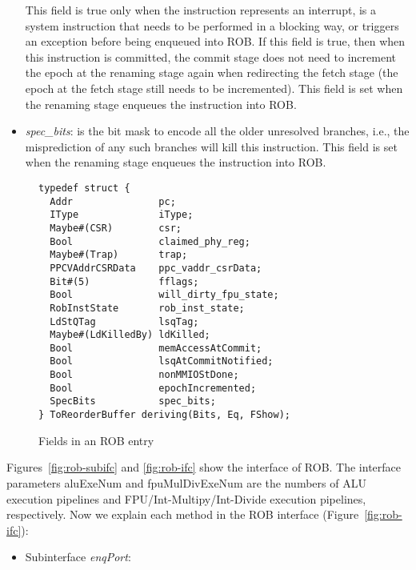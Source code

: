 \begin{itemize}
    This field is true only when the instruction represents an interrupt, is a system instruction that needs to be performed in a blocking way, or triggers an exception before being enqueued into ROB.
    If this field is true, then when this instruction is committed, the commit stage does not need to increment the epoch at the renaming stage again when redirecting the fetch stage (the epoch at the fetch stage still needs to be incremented).
    This field is set when the renaming stage enqueues the instruction into ROB.
    \item \emph{spec\_bits}: is the bit mask to encode all the older unresolved branches, i.e., the misprediction of any such branches will kill this instruction.
    This field is set when the renaming stage enqueues the instruction into ROB.
\end{itemize}

\begin{figure}[!htb]
\begin{lstlisting}[caption={}]
typedef struct {
  Addr               pc;
  IType              iType;
  Maybe#(CSR)        csr;
  Bool               claimed_phy_reg;
  Maybe#(Trap)       trap;
  PPCVAddrCSRData    ppc_vaddr_csrData;
  Bit#(5)            fflags;
  Bool               will_dirty_fpu_state;
  RobInstState       rob_inst_state;
  LdStQTag           lsqTag;
  Maybe#(LdKilledBy) ldKilled;
  Bool               memAccessAtCommit;
  Bool               lsqAtCommitNotified;
  Bool               nonMMIOStDone;
  Bool               epochIncremented;
  SpecBits           spec_bits;
} ToReorderBuffer deriving(Bits, Eq, FShow);
\end{lstlisting}
\caption{Fields in an ROB entry}\label{fig:rob-entry}
\end{figure}

Figures~\ref{fig:rob-subifc} and \ref{fig:rob-ifc} show the interface of ROB.
The interface parameters aluExeNum and fpuMulDivExeNum are the numbers of ALU execution pipelines and FPU/Int-Multipy/Int-Divide execution pipelines, respectively.
Now we explain each method in the ROB interface (Figure~\ref{fig:rob-ifc}):
\begin{itemize}
    \item Subinterface \emph{enqPort}: 
\end{itemize}

